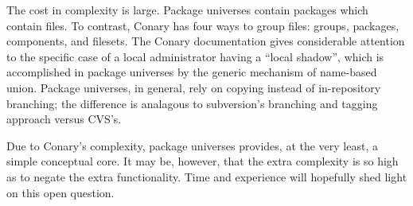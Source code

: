 \documentclass{article}
\begin{document}
The cost in complexity is large.  Package universes contain packages
which contain files.  To contrast, Conary has four ways to group
files: groups, packages, components, and filesets.  The Conary
documentation gives considerable attention to the specific case of a
local administrator having a ``local shadow'', which is accomplished
in package universes by the generic mechanism of name-based union.
Package universes, in general, rely on copying instead of
in-repository branching; the difference is analagous to subversion's
branching and tagging approach
versus CVS's.


Due to Conary's complexity, package universes provides, at the very
least, a simple conceptual core.  It may be, however, that the extra
complexity is so high as to negate the extra functionality.  Time and
experience will hopefully shed light on this open question.




\end{document}
